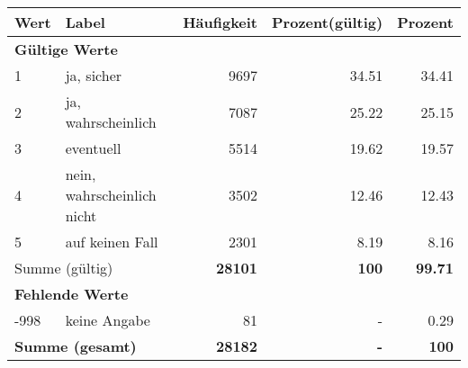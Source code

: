      \begin{longtable}{lXrrr}
     \toprule
     \textbf{Wert} & \textbf{Label} & \textbf{Häufigkeit} & \textbf{Prozent(gültig)} & \textbf{Prozent} \\
     \endhead
     \midrule
     \multicolumn{5}{l}{\textbf{Gültige Werte}}\\

     1 &
     \multicolumn{1}{X}{ ja, sicher   } &


       \num{9697} &
       \num[round-mode=places,round-precision=2]{34,51} &
         \num[round-mode=places,round-precision=2]{34,41} \\

     2 &
     \multicolumn{1}{X}{ ja, wahrscheinlich   } &


       \num{7087} &
       \num[round-mode=places,round-precision=2]{25,22} &
         \num[round-mode=places,round-precision=2]{25,15} \\

     3 &
     \multicolumn{1}{X}{ eventuell   } &


       \num{5514} &
       \num[round-mode=places,round-precision=2]{19,62} &
         \num[round-mode=places,round-precision=2]{19,57} \\

     4 &
     \multicolumn{1}{X}{ nein, wahrscheinlich nicht   } &


       \num{3502} &
       \num[round-mode=places,round-precision=2]{12,46} &
         \num[round-mode=places,round-precision=2]{12,43} \\

     5 &
     \multicolumn{1}{X}{ auf keinen Fall   } &


       \num{2301} &
       \num[round-mode=places,round-precision=2]{8,19} &
         \num[round-mode=places,round-precision=2]{8,16} \\
     \midrule
     \multicolumn{2}{l}{Summe (gültig)} &
       \textbf{\num{28101}} &
     \textbf{100} &
       \textbf{\num[round-mode=places,round-precision=2]{99,71}} \\
     \multicolumn{5}{l}{\textbf{Fehlende Werte}}\\
       -998 &
       keine Angabe &
         \num{81} &
        - &
         \num[round-mode=places,round-precision=2]{0,29} \\
     \midrule
     \multicolumn{2}{l}{\textbf{Summe (gesamt)}} &
          \textbf{\num{28182}} &
        \textbf{-} &
        \textbf{100} \\
     \bottomrule
     \end{longtable}
     

